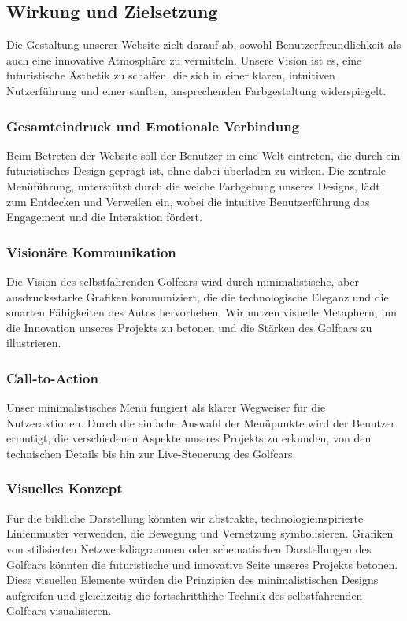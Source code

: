 \subsection{Wirkung und Zielsetzung}

Die Gestaltung unserer Website zielt darauf ab, sowohl Benutzerfreundlichkeit als auch eine innovative Atmosphäre zu vermitteln. Unsere Vision ist es, eine futuristische Ästhetik zu schaffen, die sich in einer klaren, intuitiven Nutzerführung und einer sanften, ansprechenden Farbgestaltung widerspiegelt.

\subsubsection{Gesamteindruck und Emotionale Verbindung}
Beim Betreten der Website soll der Benutzer in eine Welt eintreten, die durch ein futuristisches Design geprägt ist, ohne dabei überladen zu wirken. Die zentrale Menüführung, unterstützt durch die weiche Farbgebung unseres Designs, lädt zum Entdecken und Verweilen ein, wobei die intuitive Benutzerführung das Engagement und die Interaktion fördert.

\subsubsection{Visionäre Kommunikation}
Die Vision des selbstfahrenden Golfcars wird durch minimalistische, aber ausdrucksstarke Grafiken kommuniziert, die die technologische Eleganz und die smarten Fähigkeiten des Autos hervorheben. Wir nutzen visuelle Metaphern, um die Innovation unseres Projekts zu betonen und die Stärken des Golfcars zu illustrieren.

\subsubsection{Call-to-Action}
Unser minimalistisches Menü fungiert als klarer Wegweiser für die Nutzeraktionen. Durch die einfache Auswahl der Menüpunkte wird der Benutzer ermutigt, die verschiedenen Aspekte unseres Projekts zu erkunden, von den technischen Details bis hin zur Live-Steuerung des Golfcars.

\subsubsection{Visuelles Konzept}
Für die bildliche Darstellung könnten wir abstrakte, technologieinspirierte Linienmuster verwenden, die Bewegung und Vernetzung symbolisieren. Grafiken von stilisierten Netzwerkdiagrammen oder schematischen Darstellungen des Golfcars könnten die futuristische und innovative Seite unseres Projekts betonen. Diese visuellen Elemente würden die Prinzipien des minimalistischen Designs aufgreifen und gleichzeitig die fortschrittliche Technik des selbstfahrenden Golfcars visualisieren.


